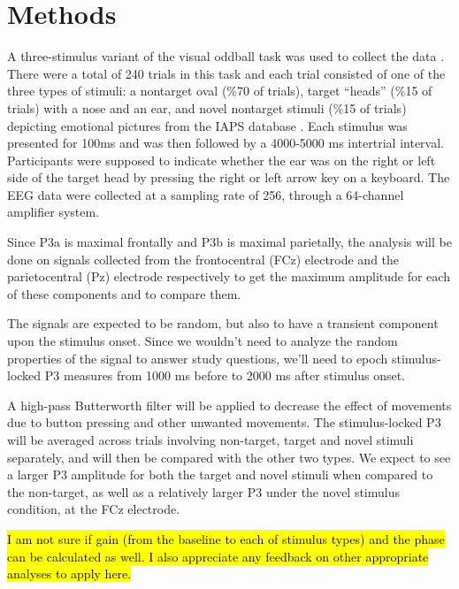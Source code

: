 \documentclass[a4paper,man,natbib]{apa6}
\begin{document}
\section{Methods}
\label{sec:examples}

A three-stimulus variant of the visual oddball task was used to collect the data \citep{Begleiter1984Event-relatedAlcoholism}. There were a total of 240 trials in this task and each trial consisted of one of the three types of stimuli: a nontarget oval (\%70 of trials), target “heads” (\%15 of trials) with a nose and an ear, and novel nontarget stimuli (\%15 of trials) depicting emotional pictures from the IAPS database \citep{Greenwald1997InternationalRatings}. Each stimulus was presented for 100ms and was then followed by a 4000-5000 ms intertrial interval. Participants were supposed to indicate whether the ear was on the right or left side of the target head by pressing the right or left arrow key on a keyboard. The EEG data were collected at a sampling rate of 256, through a 64-channel amplifier system.

Since P3a is maximal frontally and P3b is maximal parietally, the analysis will be done on signals collected from the frontocentral (FCz) electrode and the parietocentral (Pz) electrode respectively to get the maximum amplitude for each of these components and to compare them.

The signals are expected to be random, but also to have a transient component upon the stimulus onset. Since we wouldn’t need to analyze the random properties of the signal to answer study questions, we’ll need to epoch stimulus-locked P3 measures from 1000 ms before to 2000 ms after stimulus onset.

A high-pass Butterworth filter will be applied to decrease the effect of movements due to button pressing and other unwanted movements. The stimulus-locked P3 will be averaged across trials involving non-target, target and novel stimuli separately, and will then be compared with the other two types. We expect to see a larger P3 amplitude for both the target and novel stimuli when compared to the non-target, as well as a relatively larger P3 under the novel stimulus condition, at the FCz electrode.

\textcolor{red}{\hl{I am not sure if gain (from the baseline to each of stimulus types) and the phase can be calculated as well. I also appreciate any feedback on other appropriate analyses to apply here.}}


\end{document}
